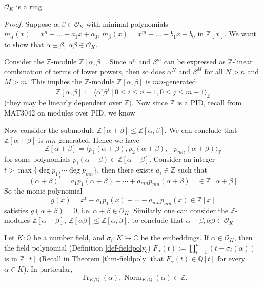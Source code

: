 \begin{theorem} \label{thm-okring}
    $\mathcal{O}_K$ is a ring.
\end{theorem}
\begin{proof}
    Suppose $\alpha,\beta \in \mathcal{O}_K$ with minimal polynomials $m_{\alpha}(x) = x^n + \dots + a_1x + a_0$, $m_{\beta}(x) = x^m + \dots + b_1x + b_0$ in $\mathbb{Z}[x]$. We want to show that $\alpha \pm \beta,\ \alpha\beta\in \mathcal{O}_K$.
    
    Consider the $\mathbb{Z}$-module $\mathbb{Z}[\alpha, \beta]$. Since $\alpha^n$ and $\beta^m$ can be expressed as $\mathbb{Z}$-linear combination of terms of lower powers, then so does $\alpha^N$ and $\beta^M$ for all $N > n$ and $M > m$. This implies the $\mathbb{Z}$-module $\mathbb{Z}[\alpha, \beta]$ is $mn$-generated:
    $$\mathbb{Z}[\alpha, \beta]:=\langle \alpha^i\beta^j\ |\ 0\leq i\leq n-1, 0\leq j\leq m-1\rangle_\mathbb{Z} $$
    (they may be linearly dependent over $\mathbb{Z})$.
    Now since $\mathbb{Z}$ is a PID, recall from MAT3042 on modules over PID, we know 
    \begin{center}
    \end{center}
    
    Now consider the submodule $\mathbb{Z}[\alpha+\beta] \leq \mathbb{Z}[\alpha,\beta]$. We can conclude that $\mathbb{Z}[\alpha+\beta]$ is $mn$-generated. Hence we have $$\mathbb{Z}[\alpha+\beta]=\langle p_1(\alpha+\beta), p_2(\alpha+\beta),\cdots p_{mn}(\alpha+\beta)\rangle_{\mathbb{Z}}$$
    for some polynomials $p_i(\alpha+\beta) \in \mathbb{Z}[\alpha+\beta]$.
    Consider an integer $t > \max\{\operatorname{deg}p_1,\cdots \operatorname{deg}p_{mn}\}$, 
    then there exists $a_{i} \in \mathbb{Z}$ such that 
    $$(\alpha+\beta)^t= a_1p_1(\alpha+\beta)+\cdots + a_{mn}p_{mn}(\alpha+\beta) \quad \in \mathbb{Z}[\alpha+\beta]$$ 
    So the monic polynomial 
    $$g(x)=x^t-a_1p_1(x)-\cdots-a_{mn}p_{mn}(x) \in \mathbb{Z}[x]$$ 
    satisfies $g(\alpha+\beta)=0$, i.e. $\alpha + \beta \in \mathcal{O}_K$.
    Similarly one can consider the $\mathbb{Z}$-modules $\mathbb{Z}[\alpha - \beta],\ \mathbb{Z}[\alpha \beta] \leq\mathbb{Z}[\alpha,\beta]$, to conclude that $\alpha - \beta, \alpha\beta \in \mathcal{O}_K$
\end{proof}
\begin{corollary} \label{cor-trnormz}
    Let $K:\mathbb{Q}$ be a number field, and $\sigma_i:K\hookrightarrow \mathbb{C} $ be the embeddings. If $\alpha\in \mathcal{O}_K$, then the field polynomial (Definition \ref{def-fieldpoly}) $F_{\alpha}(t):=\prod_{i=1}^n (t-\sigma_i(\alpha)) $ is in $\mathbb{Z}[t]$ (Recall in Theorem \ref{thm-fieldpoly} that $F_{\alpha}(t) \in \mathbb{Q}[t]$ for every $\alpha\in K$). In particular, $$\operatorname{Tr}_{K/\mathbb{Q}}(\alpha), \operatorname{Norm}_{K/\mathbb{Q}}(\alpha) \in \mathbb{Z}.$$
\end{corollary}
